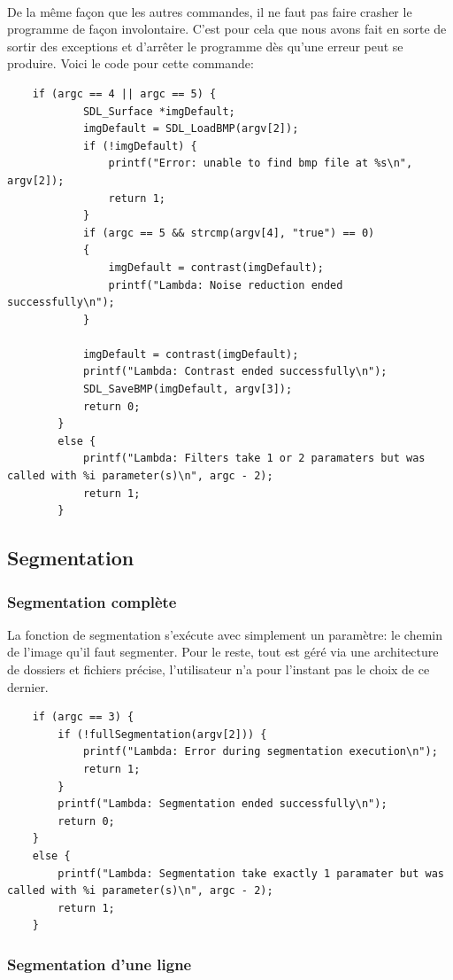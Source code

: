 \documentclass{article}
\begin{document}
\paragraph{}De la même façon que les autres commandes, il ne faut pas faire crasher le programme de façon involontaire. C'est pour cela que nous avons fait en sorte de sortir des exceptions et d'arrêter le programme dès qu'une erreur peut se produire. Voici le code pour cette commande:

\begin{lstlisting}
	if (argc == 4 || argc == 5) {
			SDL_Surface *imgDefault;
			imgDefault = SDL_LoadBMP(argv[2]);
			if (!imgDefault) {
				printf("Error: unable to find bmp file at %s\n", argv[2]);
				return 1;
			}
			if (argc == 5 && strcmp(argv[4], "true") == 0)
			{
				imgDefault = contrast(imgDefault);
				printf("Lambda: Noise reduction ended successfully\n");
			}
			
			imgDefault = contrast(imgDefault);
			printf("Lambda: Contrast ended successfully\n");
			SDL_SaveBMP(imgDefault, argv[3]);
			return 0;
		}
		else {
			printf("Lambda: Filters take 1 or 2 paramaters but was called with %i parameter(s)\n", argc - 2);
			return 1;
		}
\end{lstlisting}

\subsection{Segmentation}

\subsubsection{Segmentation complète}
La fonction de segmentation s'exécute avec simplement un paramètre: le chemin de l'image qu'il faut segmenter. Pour le reste, tout est géré via une architecture de dossiers et fichiers précise, l'utilisateur n'a pour l'instant pas le choix de ce dernier.

\begin{lstlisting}
	if (argc == 3) {
		if (!fullSegmentation(argv[2])) {
			printf("Lambda: Error during segmentation execution\n");
			return 1;
		}
		printf("Lambda: Segmentation ended successfully\n");
		return 0;
	}
	else {
		printf("Lambda: Segmentation take exactly 1 paramater but was called with %i parameter(s)\n", argc - 2);
		return 1;
	}
\end{lstlisting}

\subsubsection{Segmentation d'une ligne}
\end{document}
